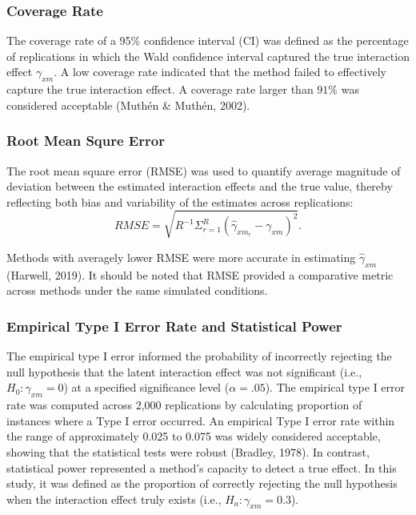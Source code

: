 \documentclass[
  man]{apa6}
\begin{document}
\subsubsection{Coverage Rate}\label{coverage-rate}

The coverage rate of a 95\(\%\) confidence interval (CI) was defined as the percentage of replications in which the Wald confidence interval captured the true interaction effect \(\gamma_{xm}\). A low coverage rate indicated that the method failed to effectively capture the true interaction effect. A coverage rate larger than \(91\%\) was considered acceptable (Muthén \& Muthén, 2002).

\subsubsection{Root Mean Squre Error}\label{root-mean-squre-error}

The root mean square error (RMSE) was used to quantify average magnitude of deviation between the estimated interaction effects and the true value, thereby reflecting both bias and variability of the estimates across replications:
\begin{equation}
RMSE = \sqrt{R^{-1}\Sigma^{R}_{r = 1}(\hat{\gamma}_{xm_{r}} - \gamma_{xm})^2}.
\end{equation}

Methods with averagely lower RMSE were more accurate in estimating \(\hat{\gamma}_{xm}\) (Harwell, 2019). It should be noted that RMSE provided a comparative metric across methods under the same simulated conditions.

\subsubsection{Empirical Type I Error Rate and Statistical Power}\label{empirical-type-i-error-rate-and-statistical-power}

The empirical type I error informed the probability of incorrectly rejecting the null hypothesis that the latent interaction effect was not significant (i.e., \(H_{0}: \gamma_{xm} = 0\)) at a specified significance level (\(\alpha = .05\)). The empirical type I error rate was computed across 2,000 replications by calculating proportion of instances where a Type I error occurred. An empirical Type I error rate within the range of approximately 0.025 to 0.075 was widely considered acceptable, showing that the statistical tests were robust (Bradley, 1978). In contrast, statistical power represented a method's capacity to detect a true effect. In this study, it was defined as the proportion of correctly rejecting the null hypothesis when the interaction effect truly exists (i.e., \(H_{a}: \gamma_{xm} = 0.3\)).
\end{document}
